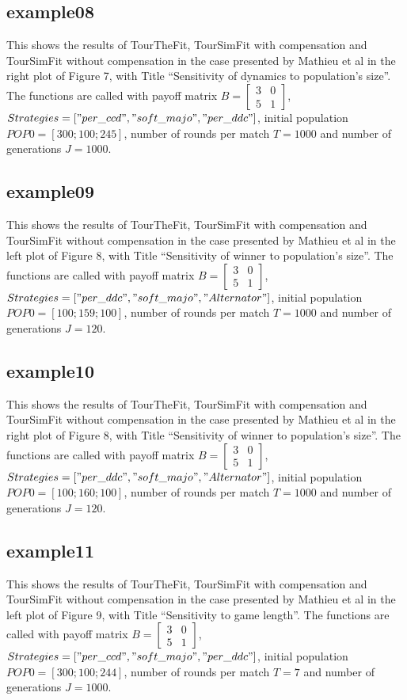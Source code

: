 \documentclass[12pt]{article}
\begin{document}
\subsection{example08}
This shows the results of TourTheFit, TourSimFit with compensation and TourSimFit without compensation in the case presented by Mathieu et al in the right plot of Figure 7, with Title ``Sensitivity of dynamics to population's size''. The functions are called with payoff matrix $B = \begin{bmatrix} 3 & 0 \\ 5 & 1 \end{bmatrix}$, $Strategies = ["per\_ccd", "soft\_majo", "per\_ddc"]$, initial population $POP0 = [300; 100; 245]$, number of rounds per match $T = 1000$ and number of generations $J = 1000$.

\subsection{example09}
This shows the results of TourTheFit, TourSimFit with compensation and TourSimFit without compensation in the case presented by Mathieu et al in the left plot of Figure 8, with Title ``Sensitivity of winner to population's size''. The functions are called with payoff matrix $B = \begin{bmatrix} 3 & 0 \\ 5 & 1 \end{bmatrix}$, $Strategies = ["per\_ddc", \- "soft\_majo", \-"Alternator"]$, initial population $POP0 = [100; 159; 100]$, number of rounds per match $T = 1000$ and number of generations $J = 120$.

\subsection{example10}
This shows the results of TourTheFit, TourSimFit with compensation and TourSimFit without compensation in the case presented by Mathieu et al in the right plot of Figure 8, with Title ``Sensitivity of winner to population's size''. The functions are called with payoff matrix $B = \begin{bmatrix} 3 & 0 \\ 5 & 1 \end{bmatrix}$, $Strategies = ["per\_ddc", "soft\_majo", "Alternator"]$, initial population $POP0 = [100; 160; 100]$, number of rounds per match $T = 1000$ and number of generations $J = 120$.

\subsection{example11}
This shows the results of TourTheFit, TourSimFit with compensation and TourSimFit without compensation in the case presented by Mathieu et al in the left plot of Figure 9, with Title ``Sensitivity to game length''. The functions are called with payoff matrix $B = \begin{bmatrix} 3 & 0 \\ 5 & 1 \end{bmatrix}$, $Strategies = ["per\_ccd", "soft\_majo", "per\_ddc"]$, initial population $POP0 = [300; 100; 244]$, number of rounds per match $T = 7$ and number of generations $J = 1000$.
\end{document}
